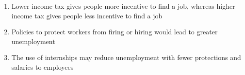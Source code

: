 \documentclass[12pt]{article}
\begin{document}
\begin{enumerate}
\begin{enumerate}
\begin{enumerate}
            \end{enumerate}

          \item Lower income tax gives people more incentive to find a job, whereas higher income tax gives people less incentive to find a job

          \item Policies to protect workers from firing or hiring would lead to greater unemployment

          \item The use of internships may reduce unemployment with fewer protections and salaries to employees

        \end{enumerate}

    \end{enumerate}
\end{document}
